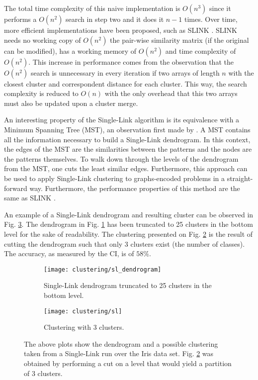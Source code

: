 The total time complexity of this naive implementation is $O(n^3)$ since it performs a $O(n^2)$ search in step two and it does it $n-1$ times.
Over time, more efficient implementations have been proposed, such as SLINK \cite{Sibson1973}.
SLINK needs no working copy of $O(n^2)$ the pair-wise similarity matrix (if the original can be modified), has a working memory of $O(n^2)$ and time complexity of $O(n^2)$.
This increase in performance comes from the observation that the $O(n^2)$ search is unnecessary in every iteration if two arrays of length $n$ with the closest cluster and correspondent distance for each cluster.
This way, the search complexity is reduced to $O(n)$ with the only overhead that this two arrays must also be updated upon a cluster merge.

An interesting property of the Single-Link algorithm is its equivalence with a Minimum Spanning Tree (MST), an observation first made by \cite{Gower1969}.
A MST contains all the information necessary to build a Single-Link dendrogram.
In this context, the edges of the MST are the similarities between the patterns and the nodes are the patterns themselves.
To walk down through the levels of the dendrogram from the MST, one cuts the least similar edges.
Furthermore, this approach can be used to apply Single-Link clustering to graphs-encoded problems in a straight-forward way.
Furthermore, the performance properties of this method are the same as SLINK 
\cite{Mullner2011}.

An example of a Single-Link dendrogram and resulting cluster can be observed in Fig. \ref{fig:sl plots}.
The dendrogram in Fig. \ref{fig:sl dendrogram} has been truncated to 25 clusters in the bottom level for the sake of readability.
The clustering presented on Fig. \ref{fig:sl clustering} is the result of cutting the dendrogram such that only 3 clusters exist (the number of classes).
The accuracy, as measured by the CI, is of $58\%$.

\begin{figure}[!ht]
    \centering
    \begin{subfigure}[b]{0.45\textwidth}
        \centering
        \texttt{[image: clustering/sl\_dendrogram]}
        \caption{Single-Link dendrogram truncated to 25 clusters in the bottom level.}
        \label{fig:sl dendrogram}
    \end{subfigure}
    \begin{subfigure}[b]{0.45\textwidth}
        \centering
        \texttt{[image: clustering/sl]}
        \caption{Clustering with 3 clusters.}
        \label{fig:sl clustering}
    \end{subfigure}

    \caption{The above plots show the dendrogram and a possible clustering taken from a Single-Link run over the Iris data set. Fig. \ref{fig:sl clustering} was obtained by performing a cut on a level that would yield a partition of 3 clusters.}
    \label{fig:sl plots}
\end{figure}